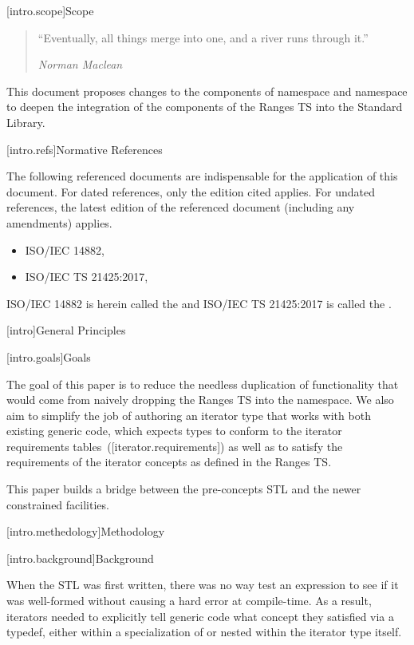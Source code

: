 [intro.scope]{Scope}

\begin{quote}
``Eventually, all things merge into one, and a river runs through it.''
\begin{flushright}
\textemdash \textit{Norman Maclean}
\end{flushright}
\end{quote}

\pnum
This document proposes changes to the components of namespace  and
namespace  to deepen the integration of the components of the
Ranges TS into the Standard Library.

[intro.refs]{Normative References}

\pnum
The following referenced documents are indispensable for the
application of this document. For dated references, only the
edition cited applies. For undated references, the latest edition
of the referenced document (including any amendments) applies.

\begin{itemize}
\item ISO/IEC 14882, 
\item ISO/IEC TS 21425:2017, 
\end{itemize}

ISO/IEC 14882 is herein called the \defn{C\Rplus\Rplus\xspace Standard} and
ISO/IEC TS 21425:2017 is called the .

[intro]{General Principles}

[intro.goals]{Goals}

\pnum
The goal of this paper is to reduce the needless duplication of functionality
that would come from naively dropping the Ranges TS into the 
namespace. We also aim to simplify the job of authoring an iterator type that
works with both existing generic code, which expects types to conform to the
iterator requirements tables~([iterator.requirements]) as well as to satisfy
the requirements of the iterator concepts as defined in the Ranges TS.

This paper builds a bridge between the pre-concepts STL and the newer
constrained facilities.

[intro.methedology]{Methodology}

[intro.background]{Background}

\pnum
When the STL was first written, there was no way test an expression to see if
it was well-formed without causing a hard error at compile-time. As a result,
iterators needed to explicitly tell generic code what concept they satisfied
via a  typedef, either within a specialization of
 or nested within the iterator type itself.

